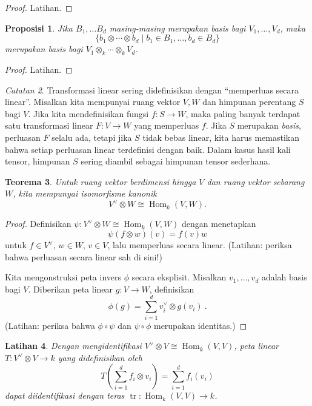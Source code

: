 \documentclass[12pt]{article}
\theoremstyle{plain}
\newtheorem{theorem}{Teorema}[section]
\newtheorem{proposition}[theorem]{Proposisi}
\newtheorem{exercise}[theorem]{Latihan}
\theoremstyle{definition}
\theoremstyle{remark}
\newtheorem{remark}[theorem]{Catatan}
\numberwithin{equation}{section}
\begin{document}
\begin{proof}
Latihan.
\end{proof}

\begin{proposition}
Jika $B_1,\ldots B_d$ masing-masing merupakan basis bagi $V_1,\ldots,V_d$, maka
\[
\{ b_1 \otimes \cdots \otimes b_d \mid b_1 \in B_1, \ldots, b_d \in B_d
\}
\]
merupakan basis bagi $V_1 \otimes_k \cdots \otimes_k V_d$.
\end{proposition}

\begin{proof}
Latihan.
\end{proof}

\begin{remark}
Transformasi linear sering didefinisikan dengan
“memperluas secara linear”.
Misalkan kita mempunyai ruang vektor $V,W$ dan himpunan perentang
$S$ bagi $V$. Jika kita mendefinisikan fungsi $f : S \to W$,
maka paling banyak terdapat satu transformasi linear $F : V \to W$
yang memperluas $f$. Jika $S$ merupakan \emph{basis}, perluasan $F$ selalu ada,
tetapi jika $S$ tidak bebas linear, kita harus memastikan bahwa setiap
perluasan linear terdefinisi dengan baik.
Dalam kasus hasil kali tensor, himpunan $S$ sering diambil sebagai
himpunan tensor sederhana.
\end{remark}

\begin{theorem}
Untuk ruang vektor berdimensi hingga $V$ dan ruang vektor sebarang
$W$, kita mempunyai isomorfisme kanonik
\[
V^\vee \otimes W \cong \operatorname{Hom}_k(V,W) .
\]
\end{theorem}

\begin{proof}
Definisikan $\psi : V^\vee \otimes W \cong \operatorname{Hom}_k(V,W)$
dengan menetapkan
\[
\psi(f \otimes w)(v) = f(v)w
\]
untuk $f \in V^\vee$, $w \in W$, $v \in V$, lalu memperluas secara linear.
(Latihan: periksa bahwa perluasan secara linear sah di sini!)

Kita mengonstruksi peta invers $\phi$ secara eksplisit.
Misalkan $v_1,\ldots, v_d$ adalah basis bagi $V$.
Diberikan peta linear $g : V \to W$, definisikan
\[
\phi(g) = \sum_{i=1}^d v^\vee_i \otimes g(v_i) \ .
\]
(Latihan: periksa bahwa $\phi \circ \psi$ dan $\psi \circ \phi$
merupakan identitas.)
\end{proof}

\begin{exercise}
Dengan mengidentifikasi $V^\vee \otimes V \cong \operatorname{Hom}_k(V,V)$,
peta linear $T: V^\vee \otimes V \to k$ yang didefinisikan oleh
\[
T\left( \sum_{i=1}^d f_i \otimes v_i\right)
= \sum_{i=1}^d f_i(v_i)
\]
dapat diidentifikasi dengan teras $\operatorname{tr} :
\operatorname{Hom}_k(V,V) \to k$.
\end{exercise}
\end{document}
